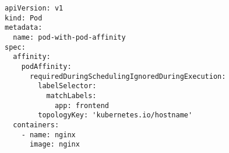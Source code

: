 \begin{verbatim}
apiVersion: v1
kind: Pod
metadata:
  name: pod-with-pod-affinity
spec:
  affinity:
    podAffinity:
      requiredDuringSchedulingIgnoredDuringExecution:
        labelSelector:
          matchLabels:
            app: frontend
        topologyKey: 'kubernetes.io/hostname'
  containers:
    - name: nginx
      image: nginx
\end{verbatim}
